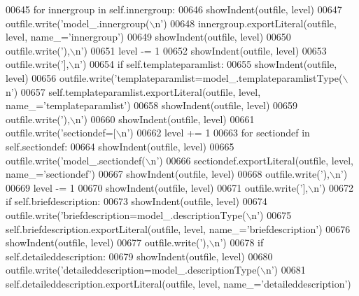 \begin{DoxyCode}
{{{{{{{{{{{{{{{{{{{{{{{{{{{{{{{{{{{00645         \textcolor{keywordflow}{for} innergroup \textcolor{keywordflow}{in} self.innergroup:
00646             showIndent(outfile, level)
00647             outfile.write(\textcolor{stringliteral}{'model\_.innergroup(\(\backslash\)n'})
00648             innergroup.exportLiteral(outfile, level, name\_=\textcolor{stringliteral}{'innergroup'})
00649             showIndent(outfile, level)
00650             outfile.write(\textcolor{stringliteral}{'),\(\backslash\)n'})
00651         level -= 1
00652         showIndent(outfile, level)
00653         outfile.write(\textcolor{stringliteral}{'],\(\backslash\)n'})
00654         \textcolor{keywordflow}{if} self.templateparamlist:
00655             showIndent(outfile, level)
00656             outfile.write(\textcolor{stringliteral}{'templateparamlist=model\_.templateparamlistType(\(\backslash\)n'})
00657             self.templateparamlist.exportLiteral(outfile, level, name\_=\textcolor{stringliteral}{'templateparamlist'})
00658             showIndent(outfile, level)
00659             outfile.write(\textcolor{stringliteral}{'),\(\backslash\)n'})
00660         showIndent(outfile, level)
00661         outfile.write(\textcolor{stringliteral}{'sectiondef=[\(\backslash\)n'})
00662         level += 1
00663         \textcolor{keywordflow}{for} sectiondef \textcolor{keywordflow}{in} self.sectiondef:
00664             showIndent(outfile, level)
00665             outfile.write(\textcolor{stringliteral}{'model\_.sectiondef(\(\backslash\)n'})
00666             sectiondef.exportLiteral(outfile, level, name\_=\textcolor{stringliteral}{'sectiondef'})
00667             showIndent(outfile, level)
00668             outfile.write(\textcolor{stringliteral}{'),\(\backslash\)n'})
00669         level -= 1
00670         showIndent(outfile, level)
00671         outfile.write(\textcolor{stringliteral}{'],\(\backslash\)n'})
00672         \textcolor{keywordflow}{if} self.briefdescription:
00673             showIndent(outfile, level)
00674             outfile.write(\textcolor{stringliteral}{'briefdescription=model\_.descriptionType(\(\backslash\)n'})
00675             self.briefdescription.exportLiteral(outfile, level, name\_=\textcolor{stringliteral}{'briefdescription'})
00676             showIndent(outfile, level)
00677             outfile.write(\textcolor{stringliteral}{'),\(\backslash\)n'})
00678         \textcolor{keywordflow}{if} self.detaileddescription:
00679             showIndent(outfile, level)
00680             outfile.write(\textcolor{stringliteral}{'detaileddescription=model\_.descriptionType(\(\backslash\)n'})
00681             self.detaileddescription.exportLiteral(outfile, level, name\_=\textcolor{stringliteral}{'detaileddescription'})
}}}}}}}}}}}}}}}}}}}}}}}}}}}}}}}}}}}
\end{DoxyCode}
